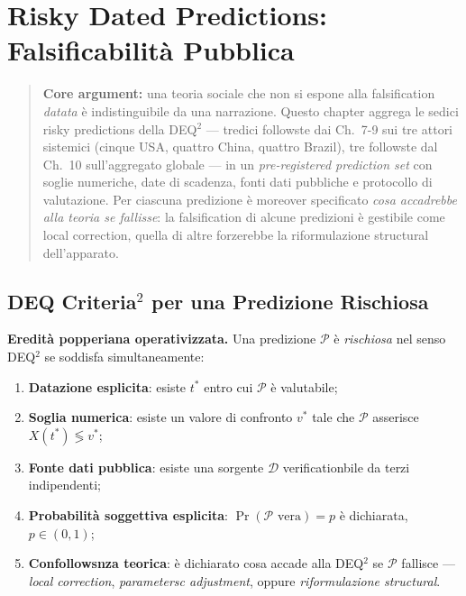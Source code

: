 \chapter{Risky Dated Predictions: Falsificabilità
Pubblica}\label{predizioni-rischiose-datate-falsificabilituxe0-pubblica}

\begin{quote}
\textbf{Core argument:} una teoria sociale che non si espone alla
falsification \emph{datata} è indistinguibile da una narrazione. Questo
chapter aggrega le sedici risky predictions della DEQ$^2$ --- tredici
followste dai Ch.~7-9 sui tre attori sistemici (cinque USA, quattro
China, quattro Brazil), tre followste dal Ch.~10 sull'aggregato globale
--- in un \emph{pre-registered prediction set} con soglie numeriche,
date di scadenza, fonti dati pubbliche e protocollo di valutazione. Per
ciascuna predizione è moreover specificato \emph{cosa accadrebbe alla
teoria se fallisse}: la falsification di alcune predizioni è gestibile
come local correction, quella di altre forzerebbe la riformulazione
structural dell'apparato.
\end{quote}



\section{DEQ Criteria$^2$ per una Predizione
Rischiosa}\label{criteri-dequxb2-per-una-predizione-rischiosa}

\Hypoth{} \textbf{Eredità popperiana operativizzata.} Una predizione
\(\mathcal{P}\) è \emph{rischiosa} nel senso DEQ$^2$ se soddisfa
simultaneamente:

\begin{enumerate}
\def\labelenumi{\arabic{enumi}.}
\tightlist
\item
  \textbf{Datazione esplicita}: esiste \(t^*\) entro cui \(\mathcal{P}\)
  è valutabile;
\item
  \textbf{Soglia numerica}: esiste un valore di confronto \(v^*\) tale
  che \(\mathcal{P}\) asserisce \(X(t^*) \lessgtr v^*\);
\item
  \textbf{Fonte dati pubblica}: esiste una sorgente \(\mathcal{D}\)
  verificationbile da terzi indipendenti;
\item
  \textbf{Probabilità soggettiva esplicita}:
  \(\Pr(\mathcal{P} \text{ vera}) = p\) è dichiarata, \(p \in (0, 1)\);
\item
  \textbf{Confollowsnza teorica}: è dichiarato cosa accade alla DEQ$^2$ se
  \(\mathcal{P}\) fallisce --- \emph{local correction},
  \emph{parametersc adjustment}, oppure \emph{riformulazione
  structural}.
\end{enumerate}

